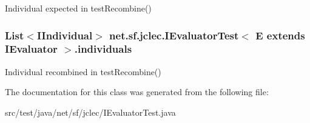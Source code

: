 Individual expected in test\-Recombine() \hypertarget{classnet_1_1sf_1_1jclec_1_1_i_evaluator_test_3_01_e_01extends_01_i_evaluator_01_4_a3ee8e5c85b3ebbfc5218bc32f986161e}{
\subsubsection[{individuals}]{\setlength{\rightskip}{0pt plus 5cm}List$<${\bf I\-Individual}$>$ net.\-sf.\-jclec.\-I\-Evaluator\-Test$<$ E extends {\bf I\-Evaluator} $>$.individuals\hspace{0.3cm}{\ttfamily [protected]}}}\label{classnet_1_1sf_1_1jclec_1_1_i_evaluator_test_3_01_e_01extends_01_i_evaluator_01_4_a3ee8e5c85b3ebbfc5218bc32f986161e}
Individual recombined in test\-Recombine() 

The documentation for this class was generated from the following file\-:\begin{DoxyCompactItemize}
\item 
src/test/java/net/sf/jclec/I\-Evaluator\-Test.\-java\end{DoxyCompactItemize}
